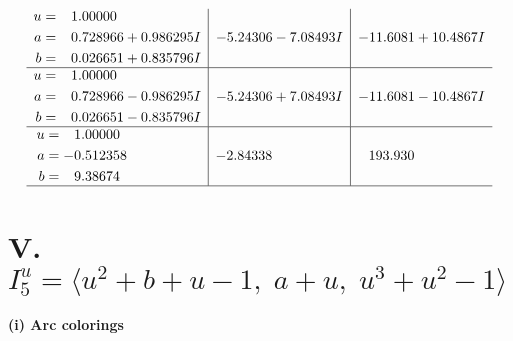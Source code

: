 \documentclass[1p]{elsarticle_modified}
\theoremstyle{definition}
\begin{document}
$$\begin{array}{c|c|c}
\begin{aligned}
u &= \phantom{-}1.00000\phantom{ +0.000000I} \\
a &= \phantom{-}0.728966 + 0.986295 I \\
b &= \phantom{-}0.026651 + 0.835796 I\end{aligned}
 & -5.24306 - 7.08493 I & -11.6081 + 10.4867 I \\ \hline\begin{aligned}
u &= \phantom{-}1.00000\phantom{ +0.000000I} \\
a &= \phantom{-}0.728966 - 0.986295 I \\
b &= \phantom{-}0.026651 - 0.835796 I\end{aligned}
 & -5.24306 + 7.08493 I & -11.6081 - 10.4867 I \\ \hline\begin{aligned}
u &= \phantom{-}1.00000\phantom{ +0.000000I} \\
a &= -0.512358\phantom{ +0.000000I} \\
b &= \phantom{-}9.38674\phantom{ +0.000000I}\end{aligned}
 & -2.84338\phantom{ +0.000000I} & \phantom{-}193.930\phantom{ +0.000000I}\\
 \hline 
 \end{array}$$\newpage\newpage\renewcommand{\arraystretch}{1}
\centering \section*{V. $I^u_{5}= \langle u^2+b+u-1,\;a+u,\;u^3+u^2-1 \rangle$}
\flushleft \textbf{(i) Arc colorings}\\
\end{document}
